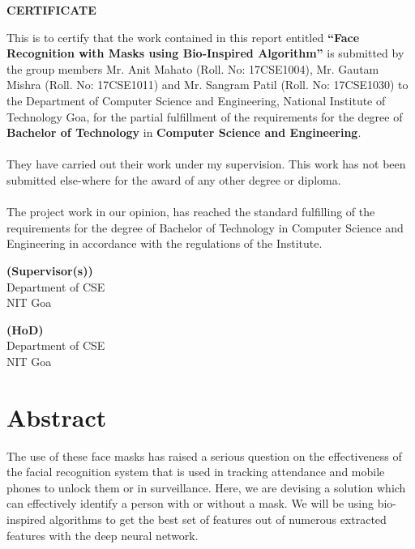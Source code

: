 \documentclass[a4paper,12pt]{report}
\begin{document}
\vspace{-13mm}
\begin{center}
\begin{normalsize}
\textbf{CERTIFICATE}\end{normalsize}
\end{center}
\vspace{0.3cm}
\noindent This is to certify that the work contained in this report entitled \textbf{“Face Recognition with Masks using Bio-Inspired Algorithm”} is submitted by the group members Mr. Anit Mahato (Roll. No: 17CSE1004), Mr. Gautam Mishra (Roll. No: 17CSE1011) and Mr. Sangram Patil (Roll. No: 17CSE1030) to the Department of Computer Science and Engineering, National Institute of Technology Goa, for the partial fulfillment of the requirements for the degree of \textbf{Bachelor of Technology} in \textbf{Computer Science and Engineering}.\\
\\
They have carried out their work under my supervision. This work has not been submitted else-where for the award of any other degree or diploma.\\
\\
The project work in our opinion, has reached the standard fulfilling of the requirements for the degree of Bachelor of Technology in Computer Science and Engineering in accordance with the regulations of the Institute.
\vspace{2cm}
\begin{flushleft}
\textbf{(Supervisor(s))}\\ Department of CSE\\ NIT Goa
\end{flushleft}
\begin{flushright}
\textbf{(HoD)}\\ Department of CSE\\ NIT Goa
\end{flushright}
\pagebreak






\section*{\centering Abstract}
The use of these face masks has raised a serious question on the effectiveness of the facial recognition system that is used in tracking attendance and mobile phones to unlock them or in surveillance. Here, we are devising a solution which can effectively identify a person with or without a mask. We will be using bio-inspired algorithms to get the best set of features out of numerous extracted features with the deep neural network. 
\end{document}
